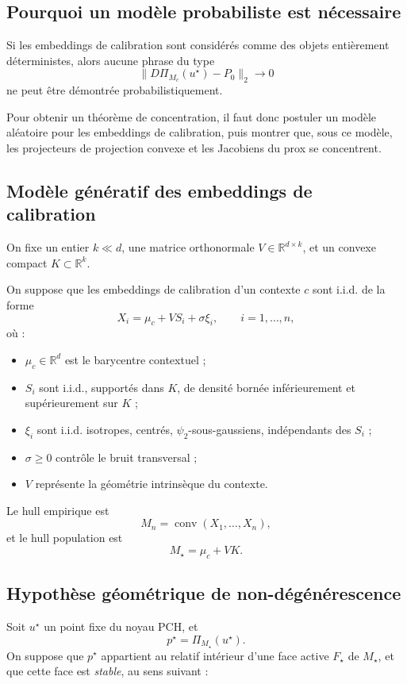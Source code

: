 \subsection{Pourquoi un modèle probabiliste est nécessaire}

Si les embeddings de calibration sont considérés comme des objets entièrement déterministes,
alors aucune phrase du type
\[
\|D\Pi_{M_c}(u^\star)-P_0\|_2\to 0
\]
ne peut être démontrée probabilistiquement.

Pour obtenir un théorème de concentration, il faut donc postuler un modèle aléatoire pour les embeddings de calibration, puis montrer que, sous ce modèle, les projecteurs de projection convexe et les Jacobiens du prox se concentrent.

\subsection{Modèle génératif des embeddings de calibration}

On fixe un entier \(k\ll d\), une matrice orthonormale \(V\in\mathbb R^{d\times k}\),
et un convexe compact \(K\subset\mathbb R^k\).

On suppose que les embeddings de calibration d'un contexte \(c\) sont i.i.d. de la forme
\[
X_i=\mu_c+V S_i+\sigma \xi_i,
\qquad i=1,\dots,n,
\]
où :

\begin{itemize}
    \item \(\mu_c\in\mathbb R^d\) est le barycentre contextuel ;
    \item \(S_i\) sont i.i.d., supportés dans \(K\), de densité bornée inférieurement et supérieurement sur \(K\) ;
    \item \(\xi_i\) sont i.i.d. isotropes, centrés, \(\psi_2\)-sous-gaussiens, indépendants des \(S_i\) ;
    \item \(\sigma\ge 0\) contrôle le bruit transversal ;
    \item \(V\) représente la géométrie intrinsèque du contexte.
\end{itemize}

Le hull empirique est
\[
M_n=\operatorname{conv}(X_1,\dots,X_n),
\]
et le hull population est
\[
M_\star=\mu_c+VK.
\]

\subsection{Hypothèse géométrique de non-dégénérescence}

Soit \(u^\star\) un point fixe du noyau PCH, et
\[
p^\star=\Pi_{M_\star}(u^\star).
\]
On suppose que \(p^\star\) appartient au relatif intérieur d'une face active \(F_\star\) de \(M_\star\),
et que cette face est \emph{stable}, au sens suivant :

